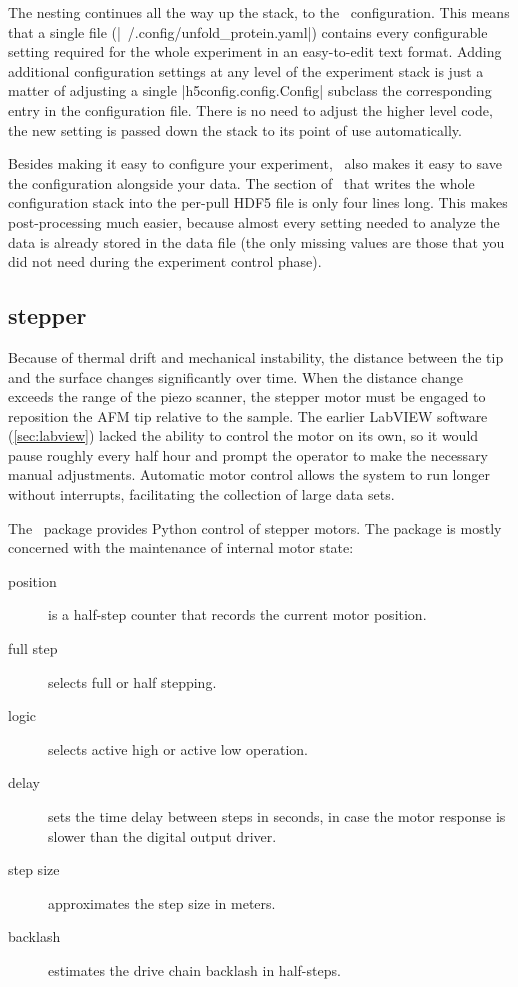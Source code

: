 The nesting continues all the way up the stack, to the
\unfoldprotein\ configuration.  This means that a single file
(|~/.config/unfold_protein.yaml|) contains every
configurable setting required for the whole experiment in an
easy-to-edit text format.  Adding additional configuration settings at
any level of the experiment stack is just a matter of adjusting a
single |h5config.config.Config| subclass the
corresponding entry in the configuration file.  There is no need to
adjust the higher level code, the new setting is passed down the stack
to its point of use automatically.

Besides making it easy to configure your experiment, \hFconfig\ also
makes it easy to save the configuration alongside your data.  The
section of \unfoldprotein\ that writes the whole configuration stack
into the per-pull HDF5 file is only four lines long.  This makes
post-processing much easier, because almost every setting needed to
analyze the data is already stored in the data file (the only missing
values are those that you did not need during the experiment control
phase).

\subsection{stepper}
\label{sec:pyafm:stepper}

Because of thermal drift and mechanical instability, the distance
between the tip and the surface changes significantly over time.  When
the distance change exceeds the range of the piezo scanner, the
stepper motor must be engaged to reposition the AFM tip relative to
the sample.  The earlier LabVIEW software (\cref{sec:labview}) lacked
the ability to control the motor on its own, so it would pause roughly
every half hour and prompt the operator to make the necessary manual
adjustments.  Automatic motor control allows the system to run longer
without interrupts, facilitating the collection of large data sets.

The \stepper\ package provides Python control of stepper
motors\cite{jones95}.  The package is mostly concerned with the
maintenance of internal motor state:

\begin{description}
  \item[position] is a half-step counter that records the current
    motor position.
  \item[full step] selects full or half stepping.
  \item[logic] selects active high or active low operation.
  \item[delay] sets the time delay between steps in seconds, in case
    the motor response is slower than the digital output driver.
  \item[step size] approximates the step size in meters.
  \item[backlash] estimates the drive chain backlash in half-steps.
\end{description}

